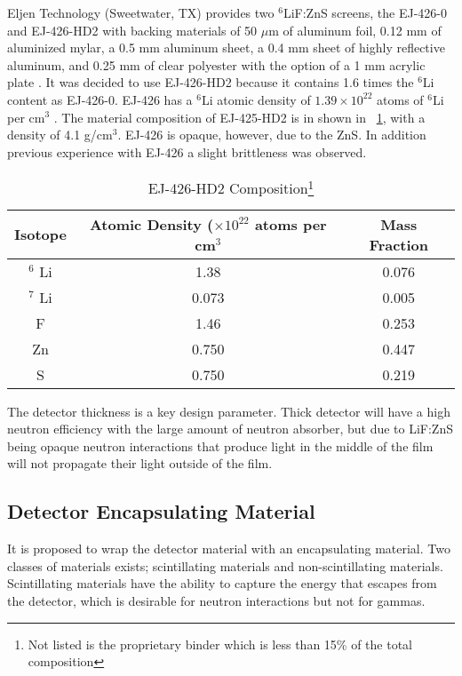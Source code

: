 Eljen Technology (Sweetwater, TX) provides two ${}^6$LiF:ZnS screens, the EJ-426-0 and EJ-426-HD2 with backing materials   of 50 $\mu$m of aluminum foil, 0.12 mm of aluminized mylar, a 0.5 mm aluminum sheet, a 0.4 mm sheet of highly reflective aluminum, and 0.25 mm of clear polyester with the option of a 1 mm acrylic plate \cite{eljen_ej-426_2012}.
It was decided to use EJ-426-HD2 because it contains 1.6 times the ${}^{6}$Li content as EJ-426-0. EJ-426 has a ${}^{6}$Li atomic density of $1.39\times10^{22}$ atoms of ${}^6$Li per cm${}^3$ \cite{eljen_ej-426_2012}. 
The material composition of EJ-425-HD2 is in shown in ~\ref{tab:EJ426Composition}, with a density of 4.1 g/cm${}^3$\cite{carel_w.e_inorganic-scintillator_2001}.
EJ-426 is opaque, however, due to the ZnS.  In addition previous experience with EJ-426 a slight brittleness was observed.
\begin{table}
    \centering
    \caption{EJ-426-HD2 Composition\footnote{Not listed is the proprietary binder which is less than 15\% of the total composition} \cite{urffer_ej_2012}}
    \begin{tabular}{c|c c}
        Isotope & Atomic Density ($\times 10^{22}$ atoms per cm${}^3$ & Mass Fraction\\
        \hline
        $ {}^6 $ Li & 1.38 & 0.076\\
        $ {}^7 $ Li & 0.073 & 0.005\\
        F & 1.46 & 0.253\\
        Zn & 0.750 & 0.447\\
        S & 0.750 & 0.219\\
    \end{tabular}
    \label{tab:EJ426Composition}
\end{table}
The detector thickness is a key design parameter. 
Thick detector will have a high neutron efficiency with the large amount of neutron absorber, but due to LiF:ZnS being opaque neutron interactions that produce light in the middle of the film will not propagate their light outside of the film.

\subsection{Detector Encapsulating Material}
It is proposed to wrap the detector material with an encapsulating material.
Two classes of materials exists; scintillating materials and non-scintillating materials.  
Scintillating materials have the ability to capture the energy that escapes from the detector, which is desirable for neutron interactions but not for gammas.

